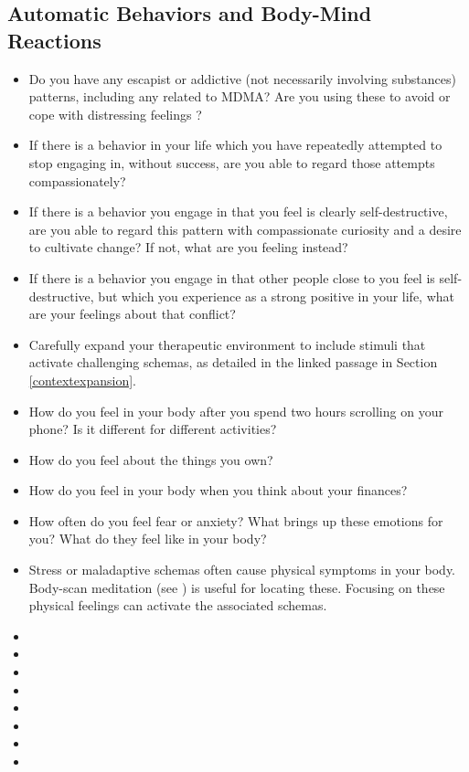 \documentclass[12pt,letterpaper]{book}
\begin{document}
\subsection*{Automatic Behaviors and Body-Mind Reactions}
\begin{itemize}
    \item Do you have any escapist or addictive (not necessarily involving substances) patterns, including any related to MDMA? Are you using these to avoid or cope with distressing feelings \cite{forsterTraumaAddiction,alaviBehavioralAddiction}?
    \item If there is a behavior in your life which you have repeatedly attempted to stop engaging in, without success, are you able to regard those attempts compassionately?
    \item If there is a behavior you engage in that you feel is clearly self-destructive, are you able to regard this pattern with compassionate curiosity and a desire to cultivate change? If not, what are you feeling instead?
    \item If there is a behavior you engage in that other people close to you feel is self-destructive, but which you experience as a strong positive in your life, what are your feelings about that conflict?
    \item Carefully expand your therapeutic environment to include stimuli that activate challenging schemas, as detailed in the linked passage in Section \ref{contextexpansion}.
    \item How do you feel in your body after you spend two hours scrolling on your phone? Is it different for different activities?
    \item How do you feel about the things you own?
    \item How do you feel in your body when you think about your finances?
    \item How often do you feel fear or anxiety? What brings up these emotions for you? What do they feel like in your body?
    \item Stress or maladaptive schemas often cause physical symptoms in your body. Body-scan meditation (see \textcite{bodyscan}) is useful for locating these. Focusing on these physical feelings can activate the associated schemas.
\end{itemize}

\begin{itemize}
    \item {}
    \item {}
    \item {}
    \item {}
    \item {}
    \item {}
    \item {}
    \item {}
\end{itemize}
\end{document}
